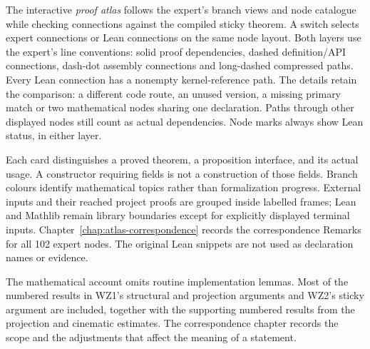 The interactive \emph{proof atlas} follows the expert's branch views and
node catalogue while checking connections against the compiled sticky
theorem. A switch selects expert connections or Lean connections on the
same node layout. Both layers use the expert's line conventions: solid
proof dependencies, dashed definition/API connections, dash-dot assembly
connections and long-dashed compressed paths. Every Lean connection has
a nonempty kernel-reference path. The details retain the comparison:
a different code route, an unused version, a missing primary match or
two mathematical nodes sharing one declaration. Paths through other
displayed nodes still count as actual dependencies. Node marks always
show Lean status, in either layer.

Each card distinguishes a proved theorem, a proposition interface, and
its actual usage. A constructor requiring fields is not a construction
of those fields. Branch colours identify mathematical topics rather
than formalization progress. External inputs and their reached project
proofs are grouped inside labelled frames; Lean and Mathlib remain
library boundaries except for explicitly displayed terminal inputs.
Chapter~\ref{chap:atlas-correspondence} records the correspondence
Remarks for all 102 expert nodes. The original Lean snippets are not
used as declaration names or evidence.

The mathematical account omits routine implementation lemmas. Most of the numbered
results in WZ1's structural and projection arguments and WZ2's sticky
argument are included, together with the supporting numbered results
from the projection and cinematic estimates. The correspondence chapter
records the scope and the adjustments that affect the meaning of a
statement.
